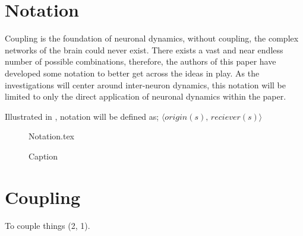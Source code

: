 \documentclass[class={myRUCProject}, crop=false]{standalone}
\begin{document}
\section{Notation}


Coupling is the foundation of neuronal dynamics, without coupling, the complex networks of the brain could never exist. There exists a vast and near endless number of possible combinations, therefore, the authors of this paper have developed some notation to better get across the ideas in play.
As the investigations will center around inter-neuron dynamics, this notation will be limited to only the direct application of neuronal dynamics within the paper.

Illustrated in , notation will be defined as; \(\langle origin(s), \, reciever(s)\rangle\)
\begin{figure}[h]
    \centering
    {Notation.tex}
    \caption{Caption}\label{fig:notation}
\end{figure}


\section{Coupling}

To couple things (2, 1).






\end{document}
